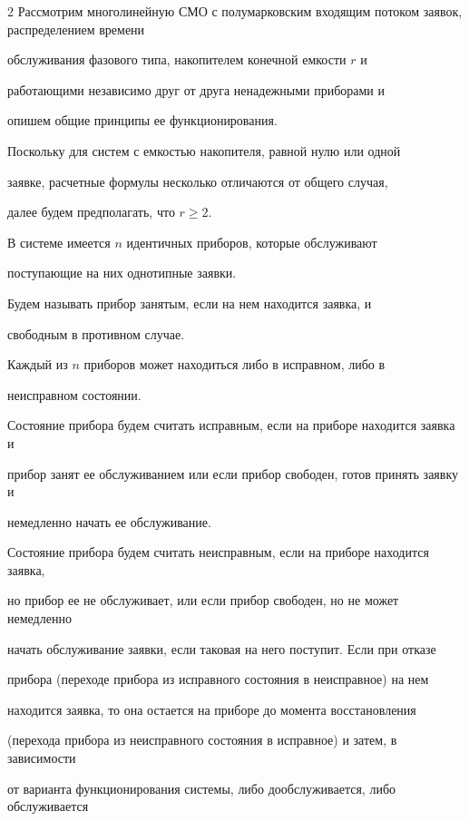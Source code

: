 \begin{multicols}{2}
Рассмотрим многолинейную СМО с полумарковским входящим потоком заявок, распределением времени


обслуживания фазового типа, накопителем конечной емкости $r$ и


работающими независимо друг от друга ненадежными приборами и


опишем общие принципы ее функционирования.


Поскольку для систем с емкостью накопителя, равной нулю или одной


заявке, расчетные формулы несколько отличаются от общего случая,


далее будем предполагать, что $r\geq 2$.





В системе имеется $n$ идентичных приборов, которые обслуживают


поступающие на них однотипные заявки.


Будем называть прибор занятым, если на нем находится заявка, и


свободным в противном случае.


Каждый из $n$ приборов может находиться либо в исправном, либо в


неисправном состоянии.





Состояние прибора будем считать исправным, если на приборе находится заявка и 


прибор занят ее обслуживанием или если прибор свободен, готов принять заявку и 


немедленно начать ее обслуживание. 





Состояние прибора будем считать неисправным, если на приборе находится заявка, 


но прибор ее не обслуживает, или если прибор свободен, но не может немедленно 


начать обслуживание заявки, если таковая на него поступит. Если при отказе 


прибора (переходе прибора из исправного состояния в неисправное) на нем 


находится заявка, то она остается на приборе до момента восстановления 


(перехода прибора из неисправного состояния в исправное) и затем, в зависимости 


от варианта функционирования системы, либо дообслуживается, либо обслуживается 



\end{multicols}
